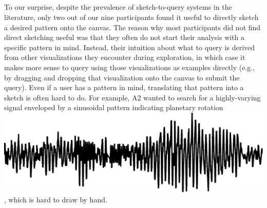  \subsection{}
 \par {} To our surprise,
 despite the prevalence of sketch-to-query
 systems in the literature,  only two out of our nine participants
 found it useful to directly
 sketch a desired pattern onto the canvas. %
 The reason why most participants
 did not find direct sketching useful was that
 they often do not start their analysis with a specific pattern in mind.
 Instead, their intuition about what to query is derived
 from other visualizations they encounter
 during exploration, in which case it makes
 more sense to query using those visualizations
 as examples directly (e.g., by dragging and dropping
 that visualization onto the canvas to submit the query).
 Even if a user has a pattern in mind,
 translating that pattern into a sketch is often hard
 to do. For example,
 A2 wanted to search for a highly-varying signal
 enveloped by a sinusoidal pattern indicating
 planetary rotation \includegraphics[width=2\baselineskip,keepaspectratio]{figures/impossible_sketch.png}, which is hard to draw by hand.
